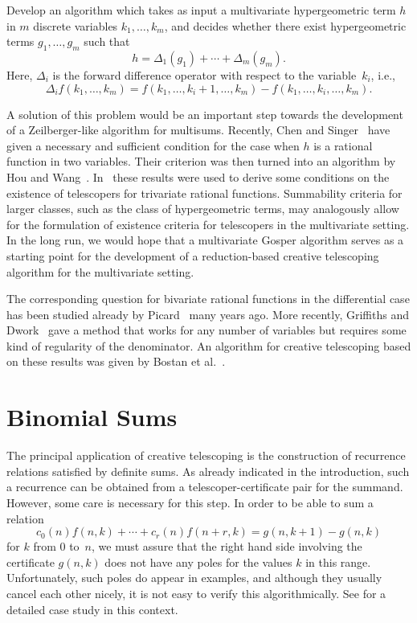 \documentclass{jssc}
\begin{document}
 \begin{problem}
   Develop an algorithm which takes as input a multivariate hypergeometric term
   $h$ in $m$ discrete variables $k_1,\dots,k_m$, and decides whether there exist
   hypergeometric terms $g_1,\dots,g_m$ such that
   \[
     h = \Delta_1(g_1) + \cdots + \Delta_m(g_m).
   \]
   Here, $\Delta_i$ is the forward difference operator with respect to
   the variable~$k_i$, i.e., \[\Delta_i
   f(k_1,\dots,k_m)=f(k_1,\dots,k_i+1,\dots,k_m)-f(k_1,\dots,k_i,\dots,k_m).\]
 \end{problem}

 A solution of this problem would be an important step towards the development
 of a Zeilberger-like algorithm for multisums. Recently, Chen and
 Singer~\cite{chen12d,chen14b} have given a necessary and sufficient condition
 for the case when $h$ is a rational function in two variables. Their criterion
 was then turned into an algorithm by Hou and Wang~\cite{hou15}.
 In~\cite{chen16} these results were used to derive some conditions on the
 existence of telescopers for trivariate rational functions. Summability
 criteria for larger classes, such as the class of hypergeometric terms, may
 analogously allow for the formulation of existence criteria for telescopers in
 the multivariate setting. In the long run, we would hope that a multivariate Gosper algorithm
 serves as a starting point for the development of a reduction-based
 creative telescoping algorithm for the multivariate setting.

 The corresponding question for bivariate rational functions in the differential
 case has been studied already by Picard~\cite{picard06,picard33} many years
 ago. More recently, Griffiths and Dwork~\cite{dwork62,dwork64,griffiths69,griffiths69a} gave a method
 that works for any number of variables but requires some kind of regularity of the denominator. An
 algorithm for creative telescoping based on these results was given by Bostan
 et al.~\cite{bostan13b}.

 \section{Binomial Sums}

 The principal application of creative telescoping is the construction of
 recurrence relations satisfied by definite sums. As already indicated in the introduction,
 such a recurrence can be obtained from a telescoper-certificate pair for the summand.
 However, some care is necessary for this step. In order to be able to sum a relation
 \[
   c_0(n)f(n,k)+\cdots+c_r(n)f(n+r,k) = g(n,k+1)-g(n,k)
 \]
 for $k$ from $0$ to~$n$, we must assure that the right hand side involving the certificate
 $g(n,k)$ does not have any poles for the values $k$ in this range. Unfortunately, such
 poles do appear in examples, and although they usually cancel each other nicely, it is not
 easy to verify this algorithmically. See \cite{chyzak14a} for a detailed case study in
 this context.
\end{document}
